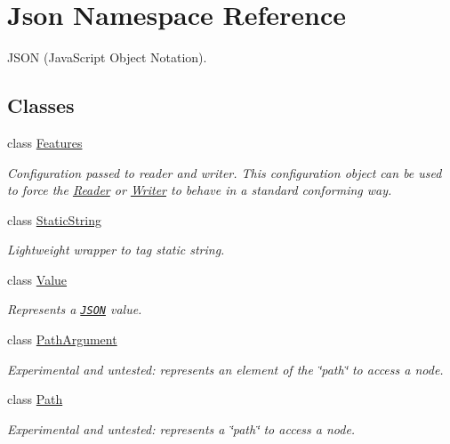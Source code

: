 \hypertarget{namespace_json}{\section{Json Namespace Reference}
\label{namespace_json}
}


J\-S\-O\-N (Java\-Script Object Notation).  


\subsection*{Classes}
\begin{DoxyCompactItemize}
\item 
class \hyperlink{class_json_1_1_features}{Features}
\begin{DoxyCompactList}\small\item\em Configuration passed to reader and writer. This configuration object can be used to force the \hyperlink{class_json_1_1_reader}{Reader} or \hyperlink{class_json_1_1_writer}{Writer} to behave in a standard conforming way. \end{DoxyCompactList}\item 
class \hyperlink{class_json_1_1_static_string}{Static\-String}
\begin{DoxyCompactList}\small\item\em Lightweight wrapper to tag static string. \end{DoxyCompactList}\item 
class \hyperlink{class_json_1_1_value}{Value}
\begin{DoxyCompactList}\small\item\em Represents a \href{http://www.json.org}{\tt J\-S\-O\-N} value. \end{DoxyCompactList}\item 
class \hyperlink{class_json_1_1_path_argument}{Path\-Argument}
\begin{DoxyCompactList}\small\item\em Experimental and untested\-: represents an element of the \char`\"{}path\char`\"{} to access a node. \end{DoxyCompactList}\item 
class \hyperlink{class_json_1_1_path}{Path}
\begin{DoxyCompactList}\small\item\em Experimental and untested\-: represents a \char`\"{}path\char`\"{} to access a node. \end{DoxyCompactList}\item 

\end{DoxyCompactItemize}

